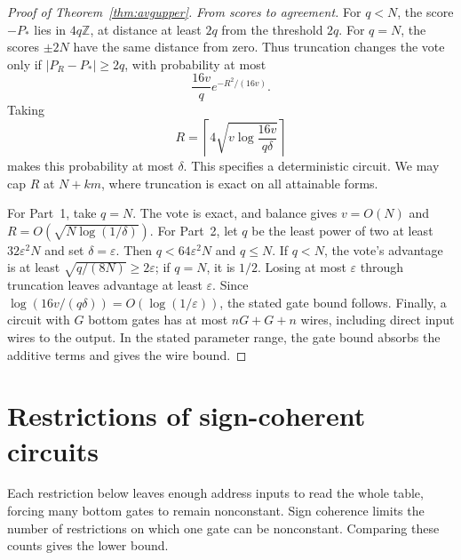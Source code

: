 \documentclass[11pt]{article}
\begin{document}
\begin{proof}[Proof of Theorem~\ref{thm:avgupper}]
\emph{From scores to agreement.}
For $q<N$, the score $-P_*$ lies in $4q\mathbb Z$, at distance at
least $2q$ from the threshold $2q$. For $q=N$, the scores $\pm2N$
have the same distance from zero. Thus truncation changes the vote
only if $|P_R-P_*|\ge2q$, with probability at most
$$
\frac{16v}{q}e^{-R^2/(16v)}.
$$
Taking
$$R=\left\lceil4\sqrt{v\log\frac{16v}{q\delta}}\right\rceil$$
makes this probability at most $\delta$. This specifies a deterministic circuit. We may cap $R$ at $N+km$,
where truncation is exact on all attainable forms.

For Part~1, take $q=N$. The vote is exact, and balance gives
$v=O(N)$ and $R=O(\sqrt{N\log(1/\delta)})$.
For Part~2, let $q$ be the least power of two at least
$32\varepsilon^2N$ and set $\delta=\varepsilon$. Then
$q<64\varepsilon^2N$ and $q\le N$. If $q<N$, the vote's advantage is
at least $\sqrt{q/(8N)}\ge2\varepsilon$; if $q=N$, it is $1/2$.
Losing at most $\varepsilon$ through truncation leaves advantage at
least $\varepsilon$. Since
$\log(16v/(q\delta))=O(\log(1/\varepsilon))$, the stated gate bound
follows. Finally, a circuit with $G$ bottom gates has at most
$nG+G+n$ wires, including direct input wires to the output. In the
stated parameter range, the gate bound absorbs the additive terms and
gives the wire bound.
\end{proof}

\section{Restrictions of sign-coherent circuits}\label{sec:coherent}
Each restriction below leaves enough address inputs to read the whole
table, forcing many bottom gates to remain nonconstant. Sign coherence
limits the number of restrictions on which one gate can be nonconstant.
Comparing these counts gives the lower bound.
\end{document}
